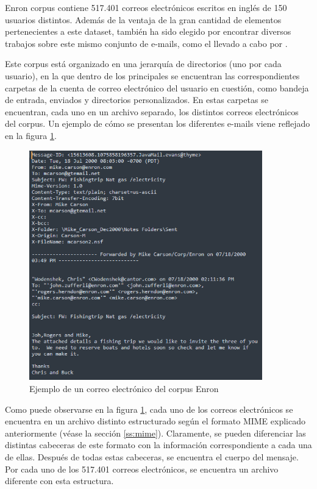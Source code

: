Enron corpus contiene 517.401 correos electrónicos escritos en inglés de 150 usuarios distintos. Además de la ventaja de la gran cantidad de elementos pertenecientes a este dataset, también ha sido elegido por encontrar diversos trabajos sobre este mismo conjunto de e-mails, como el llevado a cabo por \cite{klimt2004introducing}.

Este corpus está organizado en una jerarquía de directorios (uno por cada usuario), en la que dentro de los principales se encuentran las correspondientes carpetas de la cuenta de correo electrónico del usuario en cuestión, como bandeja de entrada, enviados y directorios personalizados. En estas carpetas se encuentran, cada uno en un archivo separado, los distintos correos electrónicos del corpus. Un ejemplo de cómo se presentan los diferentes e-mails viene reflejado en la figura \ref{fig:emailenron}.

\begin{figure}[h]
	\centering%
	\centerline{\includegraphics[width = 0.9\textwidth]{Imagenes/Bitmap/email-example.png}}%
	\caption{Ejemplo de un correo electrónico del corpus Enron}%
	\label{fig:emailenron}
\end{figure}

Como puede observarse en la figura \ref{fig:emailenron}, cada uno de los correos electrónicos se encuentra en un archivo distinto estructurado según el formato MIME explicado anteriormente (véase la sección \ref{ss:mime}). Claramente, se pueden diferenciar las distintas cabeceras de este formato con la información correspondiente a cada una de ellas. Después de todas estas cabeceras, se encuentra el cuerpo del mensaje. Por cada uno de los 517.401 correos electrónicos, se encuentra un archivo diferente con esta estructura.

